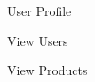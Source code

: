 \documentclass[11pt]{report}
\begin{document}
\begin{figure}[H]
	\caption{User Profile}
\end{figure}
\begin{figure}[H]
	\caption{View Users}
\end{figure}
\begin{figure}[H]
	\caption{View Products}
\end{figure}
\end{document}
